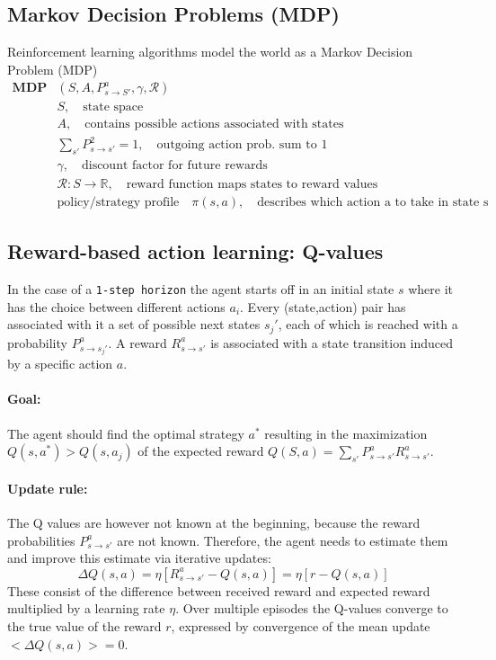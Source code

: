 \documentclass[11pt]{article}
\begin{document}
\subsection{Markov Decision Problems (MDP)}
Reinforcement learning algorithms model the world as a Markov Decision Problem (MDP) 
\begin{align*}
\mathbf{MDP}&\left(S, A, P_{s\rightarrow S'}^a, \gamma, \mathcal{R}\right)\\
&S,\quad \text{state space}\\
&A,\quad \text{contains possible actions associated with states}\\
&\sum_{s'}P_{s\rightarrow s'}^2=1,\quad\text{outgoing action prob. sum to 1}\\
&\gamma, \quad\text{discount factor for future rewards}\\
&\mathcal{R}:S\rightarrow\mathbb{R}, \quad \text{reward function maps states to reward values}\\
&\text{policy/strategy profile}\quad \pi(s,a), \quad \text{describes which action a to take in state s}
\end{align*}

\subsection{Reward-based action learning: Q-values}
In the case of a \texttt{1-step horizon} the agent starts off in an initial state $s$ where it has the choice between different actions $a_i$. Every (state,action) pair has associated with it a set of possible next states $s_j'$, each of which is reached with a probability $P_{s\rightarrow s_j'}^a$. A reward $R_{s \rightarrow s'}^a$ is associated with a state transition induced by a specific action $a$.
\paragraph{Goal:} The agent should find the optimal strategy $a^*$ resulting in the maximization $Q(s,a^*) > Q(s, a_j)$ of the expected reward $Q(S,a)=\sum_{s'} P_{s \rightarrow s'}^a R_{s \rightarrow s'}^a$.

\paragraph{Update rule:}
The Q values are however not known at the beginning, because the reward probabilities $P_{s \rightarrow s'}^a$ are not known. Therefore, the agent needs to estimate them and improve this estimate via iterative updates: 
\[
\Delta Q(s,a) = \eta\left[R_{s \rightarrow s'}^a-Q(s,a)\right]=\eta\left[r-Q(s,a)\right]
\]
These consist of the difference between received reward and expected reward multiplied by a learning rate $\eta$. Over multiple episodes the Q-values converge to the true value of the reward $r$, expressed by convergence of the mean update $<\Delta Q(s,a)> = 0$.
\end{document}
